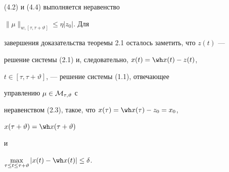 (4.2) и (4.4) выполняется неравенство


$\|\mu\|_{w,[\tau,\tau+\vartheta]}\le\eta|z_{0}|$. Для


завершения доказательства теоремы 2.1 осталось заметить, что $z(t)$ ---


решение системы (2.1) и, следовательно, $x(t)=\wh x(t)-z(t)$,


$t\in[\tau,\tau+\vartheta]$, --- решение системы (1.1), отвечающее


управлению $\mu\in\cal M_{\tau,\vartheta}$ с


неравенством (2.3), такое, что $x(\tau)=\wh x(\tau)-z_0=x_0$,


$x(\tau+\vartheta)=\wh x(\tau+\vartheta)$


и


$\max\limits_{\tau\le t\le\tau+\vartheta}|x(t)-\wh x(t)|\le\delta$.





